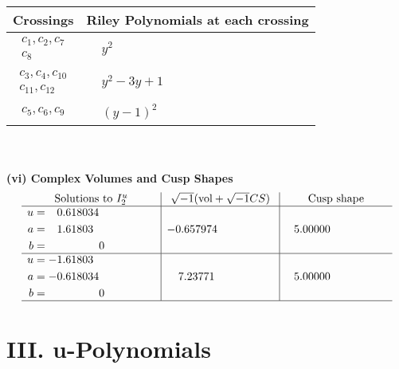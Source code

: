 \documentclass[1p]{elsarticle_modified}
\theoremstyle{definition}
\newcommand{\I}{\sqrt{-1}}
\begin{document}
\begin{tabular}{m{50pt}|m{274pt}}
Crossings & \hspace{64pt}Riley Polynomials at each crossing \\
\hline $$\begin{aligned}c_{1},c_{2},c_{7}\\c_{8}\end{aligned}$$&$\begin{aligned}
&y^2
\end{aligned}$\\
\hline $$\begin{aligned}c_{3},c_{4},c_{10}\\c_{11},c_{12}\end{aligned}$$&$\begin{aligned}
&y^2-3 y+1
\end{aligned}$\\
\hline $$\begin{aligned}c_{5},c_{6},c_{9}\end{aligned}$$&$\begin{aligned}
&(y-1)^2
\end{aligned}$\\
\hline
\end{tabular}\\~\\
\newpage\flushleft \textbf{(vi) Complex Volumes and Cusp Shapes}
$$\begin{array}{c|c|c}  
\text{Solutions to }I^u_{2}& \I (\text{vol} + \sqrt{-1}CS) & \text{Cusp shape}\\
 \hline 
\begin{aligned}
u &= \phantom{-}0.618034\phantom{ +0.000000I} \\
a &= \phantom{-}1.61803\phantom{ +0.000000I} \\
b &= \phantom{-0.000000 } 0\end{aligned}
 & -0.657974\phantom{ +0.000000I} & \phantom{-}5.00000\phantom{ +0.000000I} \\ \hline\begin{aligned}
u &= -1.61803\phantom{ +0.000000I} \\
a &= -0.618034\phantom{ +0.000000I} \\
b &= \phantom{-0.000000 } 0\end{aligned}
 & \phantom{-}7.23771\phantom{ +0.000000I} & \phantom{-}5.00000\phantom{ +0.000000I}\\
 \hline 
 \end{array}$$\newpage
\newpage\renewcommand{\arraystretch}{1}
\centering \section*{ III. u-Polynomials}
\end{document}
